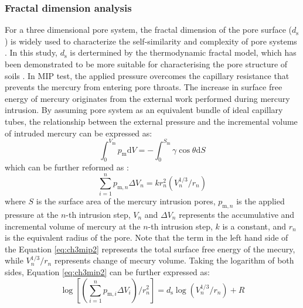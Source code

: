 \subsubsection{Fractal dimension analysis}
For a three dimensional pore system, the fractal dimension of the pore surface ($d_{\mathrm{s}}$) is widely used to characterize the self-similarity and complexity of pore systems \parencite{perfectApplicationsFractalsSoil1995, hanRelationshipFractalFeature2022}. In this study, $d_{\mathrm{s}}$ is dertermined by the thermodynamic fractal model, which has been demonstrated to be more suitable for characterising the pore structure of soils \parencite{shiStrengthMicroscopicPore2024}. In \ac{MIP} test, the applied pressure overcomes the capillary resistance that prevents the mercury from entering pore throats. The increase in surface free energy of mercury originates from the external work performed during mercury intrusion. By assuming pore system as an equivalent bundle of ideal capillary tubes, the relationship between the external pressure and the incremental volume of intruded mercury can be expressed as:
\begin{equation}
     \int_{0}^{V_{\mathrm{m}}}p_{\mathrm{m}}\mathrm{d}V=-\int_{0}^{S_{\mathrm{m}}}\gamma \cos\theta \mathrm{d}S
\end{equation}
which can be further reformed as \parencite{shiStrengthMicroscopicPore2024}:
\begin{equation}
    \label{eq:ch3mip2}
    \sum_{i=1}^{n}p_{\mathrm{m},n}\Delta V_{n}=kr_{n}^{2}\left ( V_{n}^{1/3}/r_{n} \right )
\end{equation}
where $S$ is the surface area of the mercury intrusion pores, $p_{\mathrm{m},n}$ is the applied pressure at the $n$-th intrusion step, $V_{n}$ and $\Delta V_{n}$ represents the accumulative and incremental volume of mercury at the $n$-th intrusion step, $k$ is a constant, and $r_{n}$ is the equivalent radius of the pore. Note that the term in the left hand side of the Equation \ref{eq:ch3mip2} represents the total surface free energy of the mecury, while $V_{n}^{1/3}/r_{n}$ represents change of mecury volume. Taking the logarithm of both sides, Equation \ref{eq:ch3mip2} can be further expressed as:
\begin{equation}
    \log\left[\left(\sum_{i=1}^{n}p_{\mathrm{m},i}\Delta V_{i} \right)/r_{n}^{2} \right] = d_{\mathrm{s}} \log \left( V_{n}^{1/3}/r_{n} \right) + R
\end{equation}
